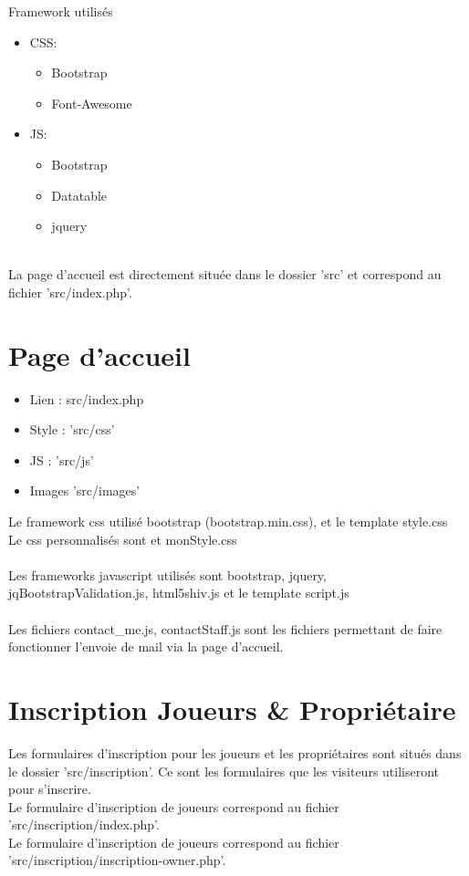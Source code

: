 \documentclass{article}
\begin{document}
Framework utilisés
\begin{itemize}
\item CSS: \begin{itemize}
        \item Bootstrap
        \item Font-Awesome
    \end{itemize}
\item JS: \begin{itemize}
        \item Bootstrap
        \item Datatable
        \item jquery
    \end{itemize}
\end{itemize}\\
La page d'accueil est directement située dans le dossier 'src' et correspond au fichier 'src/index.php'.



\section{Page d'accueil}

\begin{itemize}
\item Lien : src/index.php
\item Style : 'src/css'
\item JS : 'src/js'
\item Images 'src/images'
\end{itemize}

Le framework css utilisé bootstrap (bootstrap.min.css), et le template style.css\\
Le css personnalisés sont et monStyle.css\\
\\
Les frameworks javascript utilisés sont bootstrap, jquery, jqBootstrapValidation.js, html5shiv.js
et le template script.js\\
\\

Les fichiers contact\_me.js, contactStaff.js sont les fichiers permettant de faire fonctionner l'envoie de mail via la page d'accueil.\\

\section{Inscription Joueurs \& Propriétaire}
Les formulaires d'inscription pour les joueurs et les propriétaires sont situés dans le dossier 'src/inscription'. Ce sont les formulaires que les visiteurs utiliseront pour s'inscrire.\\
Le formulaire d'inscription de joueurs correspond au fichier 'src/inscription/index.php'.\\
Le formulaire d'inscription de joueurs correspond au fichier 'src/inscription/inscription-owner.php'.\\
\end{document}
